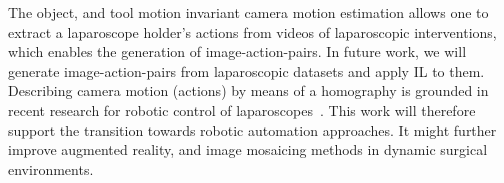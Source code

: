 The object, and tool motion invariant camera motion estimation allows one to extract a laparoscope holder's actions from videos of laparoscopic interventions, which enables the generation of image-action-pairs. In future work, we will generate image-action-pairs from laparoscopic datasets and apply IL to them. Describing camera motion (actions) by means of a homography is grounded in recent research for robotic control of laparoscopes~\cite{huber2021homographybased}. This work will therefore support the transition towards robotic automation approaches. It might further improve augmented reality, and image mosaicing methods in dynamic surgical environments.


